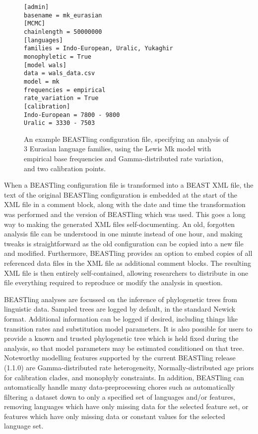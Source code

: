 \documentclass[twocolumn,10pt]{scrartcl}
\begin{document}
\begin{figure}[t]
	\begin{verbatim}[admin]
basename = mk_eurasian
[MCMC]
chainlength = 50000000
[languages]
families = Indo-European, Uralic, Yukaghir
monophyletic = True
[model wals]
data = wals_data.csv
model = mk
frequencies = empirical
rate_variation = True
[calibration]
Indo-European = 7800 - 9800
Uralic = 3330 - 7503\end{verbatim}
	\caption{An example BEASTling configuration file, specifying an analysis of 3 Eurasian language families, using the Lewis Mk model with empirical base frequencies and Gamma-distributed rate variation, and two calibration points.}
\label{fig:config}
\end{figure}

When a BEASTling configuration file is transformed into a BEAST XML file, the text of the original BEASTling configuration is embedded at the start of the XML file in a comment block, along with the date and time the transformation was performed and the version of BEASTling which was used.  This goes a long way to making the generated XML files self-documenting.  An old, forgotten analysis file can be understood in one minute instead of one hour, and making tweaks is straightforward as the old configuration can be copied into a new file and modified.  Furthermore, BEASTling provides an option to embed copies of all referenced data files in the XML file as additional comment blocks.  The resulting XML file is then entirely self-contained, allowing researchers to distribute in one file everything required to reproduce or modify the analysis in question.

BEASTling analyses are focussed on the inference of phylogenetic trees from linguistic data.  Sampled trees are logged by default, in the standard Newick format.  Additional information can be logged if desired, including things like transition rates and substitution model parameters.  It is also possible for users to provide a known and trusted phylogenetic tree which is held fixed during the analysis, so that model parameters may be estimated conditioned on that tree.  Noteworthy modelling features supported by the current BEASTling release (1.1.0) are Gamma-distributed rate heterogeneity, Normally-distributed age priors for calibration clades, and monophyly constraints.  In addition, BEASTling can automatically handle many data-preprocessing chores such as automatically filtering a dataset down to only a specified set of languages and/or features, removing languages which have only missing data for the selected feature set, or features which have only missing data or constant values for the selected language set.
\end{document}
